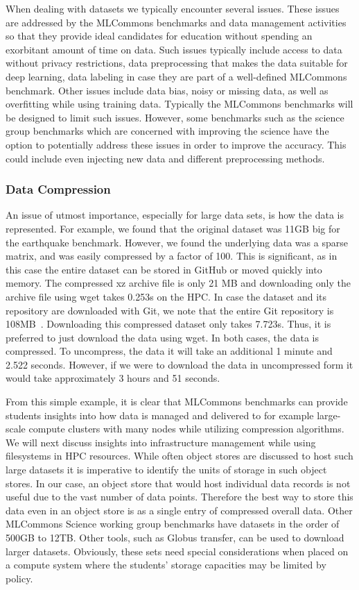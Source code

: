 \documentclass[utf8]{FrontiersinVancouver} %
\begin{document}
When dealing with datasets we typically encounter several issues.
These issues are addressed by the MLCommons benchmarks and data
management activities so that they provide ideal candidates for
education without spending an exorbitant amount of time on data. Such
issues typically include access to data without privacy restrictions,
data preprocessing that makes the data suitable for deep learning,
data labeling in case they are part of a well-defined MLCommons
benchmark. Other issues include data bias, noisy or missing data, as
well as overfitting while using training data. Typically the MLCommons
benchmarks will be designed to limit such issues. However, some benchmarks such as the science group
benchmarks which are concerned with improving the science have the option to
potentially address these issues in order to improve the
accuracy. This could include even injecting new data and different
preprocessing methods.


\subsubsection{Data Compression}

An issue of utmost importance, especially for large data sets,
is how the data is represented. For example, we found that the original dataset was 11GB big for the earthquake benchmark. However,
we found the underlying data was a sparse matrix, and was easily compressed by a factor of
100. This is significant, as in this case the entire dataset can be
stored in GitHub or moved quickly into memory. The compressed xz archive file is only 21 MB and
downloading only the archive file using wget takes 0.253s on the 
HPC. In case the
dataset and its repository are downloaded with Git, we note that the
entire Git repository is
108MB~\citep{eq-data}. Downloading this compressed
dataset only takes 7.723s. Thus, it is preferred to just download the data using wget. In both cases, the data
is compressed. To uncompress, the data it will take an additional 1
minute and 2.522 seconds. However, if we were to download the data in
uncompressed form it would take approximately 3 hours and 51 seconds.

From this simple example, it is clear that MLCommons benchmarks can
provide students insights into how data is managed and delivered to for example
large-scale compute clusters with many nodes while utilizing
compression algorithms. We will next discuss insights into
infrastructure management while using filesystems in HPC resources.
While often object stores are discussed to host such large datasets it
is imperative to identify the units of storage in such object stores.
In our case, an object store that would host individual data records
is not useful due to the vast number of data points. Therefore the
best way to store this data even in an object store is as a single
entry of compressed overall data.  Other MLCommons Science working
group benchmarks have datasets in the order of 500GB to
12TB. Other tools, such as Globus transfer, can be used to download larger datasets.
Obviously, these sets need special considerations when placed on a
compute system where the students' storage capacities may be limited by
policy.
\end{document}
